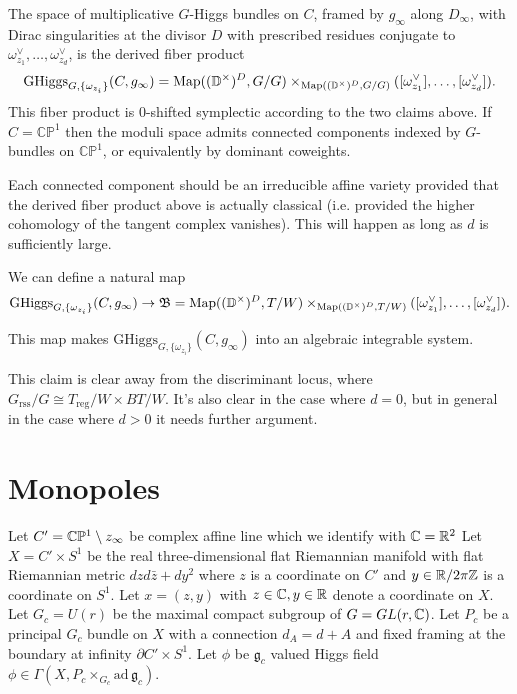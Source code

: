 \documentclass[12pt,psamsfonts,reqno]{amsart}
\begin{document}
\begin{remark}
\begin{definition}
The space of multiplicative $G$-Higgs bundles on $C$, framed by $g_\infty$ along $D_\infty$, with Dirac singularities at the divisor $D$ with prescribed residues conjugate to $\omega_{z_1}^\vee, \ldots, \omega_{z_d}^\vee$, is the derived fiber product
\[\mathrm{GHiggs}_{G, \{\omega_{z_i}\}}(C, g_\infty) =  \operatorname{Map}((\mathbb{D}^\times)^D, G/G) \times_{\operatorname{Map}((\mathbb{D}^\times)^D, G/G)} ([\omega_{z_1}^\vee], \ldots, [\omega_{z_d}^\vee]).\]
This fiber product is 0-shifted symplectic according to the two claims above.  If $C = \mathbb{CP}^1$ then the moduli space admits connected components indexed by $G$-bundles on $\mathbb{CP}^1$, or equivalently by dominant coweights.
\end{definition}

Each connected component should be an irreducible affine variety provided that the derived fiber product above is actually classical (i.e. provided the higher cohomology of the tangent complex vanishes).  This will happen as long as $d$ is sufficiently large.

We can define a natural map
\[\mathrm{GHiggs}_{G, \{\omega_{z_i}\}}(C, g_\infty) \to \mathfrak{B} =  \operatorname{Map}((\mathbb{D}^\times)^D, T/W) \times_{\operatorname{Map}((\mathbb{D}^\times)^D, T/W)} ([\omega_{z_1}^\vee], \ldots, [\omega_{z_d}^\vee]).\]

\begin{claim}
This map makes $\mathrm{GHiggs}_{G, \{\omega_{z_i}\}}(C, g_\infty)$ into an algebraic integrable system.
\end{claim}

This claim is clear away from the discriminant locus, where $G_{\mathrm{rss}}/G \cong T_{\mathrm{reg}}/W \times BT/W$.  It's also clear in the case where $d=0$, but in general in the case where $d > 0$ it needs further argument.

\section{Monopoles}


 Let $C' = \mathbb C \mathbb P^1 \setminus z_{\infty}$ be complex affine line which
  we identify with $\mathbb C = \mathbb R^2$
 Let $X  = C' \times S^1$
  be the real three-dimensional  flat Riemannian manifold  with flat Riemannian metric $ dz d \bar z + dy^2$ where $z$ is a coordinate
  on $C'$ and $y \in \mathbb R/ 2 \pi \mathbb Z$ is a coordinate on $S^1$. Let $x = (z, y)$ with $z \in \mathbb C, y \in \mathbb R$
  denote a coordinate on $X$. 
 Let $G_c = U(r)$ be the maximal compact subgroup
  of $G =GL(r, \mathbb C)$. Let $P_c$ be a principal $G_c$ bundle on $X$ with a connection $d_{A} = d + A$
  and fixed framing at the boundary at infinity $ \partial C' \times S^1$. 
  Let $\phi$ be $\mathfrak{g}_{c}$  valued Higgs field $\phi \in \Gamma(X, P_c \times_{G_c} \mathrm{ad}\, \mathfrak{g}_c)
$. 


\end{remark}
\end{document}
